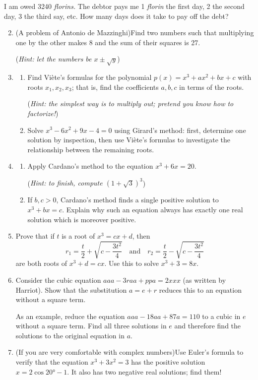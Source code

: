 \begin{exercises}{}{}
\exstart %
	I am owed 3240 \emph{florins.} The debtor pays me 1 \emph{florin} the first day, 2 the second day, 3 the third say, etc. How many days does it take to pay off the debt?
	
\begin{enumerate}\setcounter{enumi}{1}
	\item%
	(A problem of Antonio de Mazzinghi)\lstsp Find two numbers such that multiplying one by the other makes 8 and the sum of their squares is 27.\par
	(\emph{Hint: let the numbers be $x\pm\sqrt y$})

	
	\item\begin{enumerate}
	  \item Find Viète's formulas for the polynomial $p(x)=x^3+ax^2+bx+c$ with roots $x_1,x_2,x_3$; that is, find the coefficients $a,b,c$ in terms of the roots.\par
	  (\emph{Hint: the simplest way is to multiply out; pretend you know how to factorize!})
	
  	\item%
  	Solve $x^3-6x^2+9x-4=0$ using Girard's method: first, determine one solution by inspection, then use Viète's formulas to investigate the relationship between the remaining roots.
  \end{enumerate}
		
	\item\begin{enumerate}
	  \item Apply Cardano's method to the equation $x^3+6x=20$.\par
	  (\emph{Hint: to finish, compute $(1+\sqrt 3)^3$})
		\item If $b,c>0$, Cardano's method finds a single positive solution to $x^3+bx=c$. Explain why such an equation always has exactly one real solution which is moreover positive.
	\end{enumerate}
	
	\item%
	Prove that if $t$ is a root of $x^3=cx+d$, then
	\[r_1=\frac t2+\sqrt{c-\frac{3t^2}4}\quad\text{and}\quad r_2=\frac t2-\sqrt{c-\frac{3t^2}4}\]
	are both roots of $x^3+d=cx$. Use this to solve $x^3+3=8x$.
	

	\item%
	Consider the cubic equation $aaa-3raa+ppa=2xxx$ (as written by Harriot). Show that the substitution $a=e+r$ reduces this to an equation without a square term.\par
	  As an example, reduce the equation $aaa-18aa+87a=110$ to a cubic in $e$ without a square term. Find all three solutions in $e$ and therefore find the solutions to the original equation in $a$.
  
	
	\item (If you are very comfortable with complex numbers)\lstsp Use Euler's formula to verify that the equation $x^3+3x^2=3$ has the positive solution $x=2\cos\ang{20}-1$. It also has two negative real solutions; find them! 
\end{enumerate}
\end{exercises}

